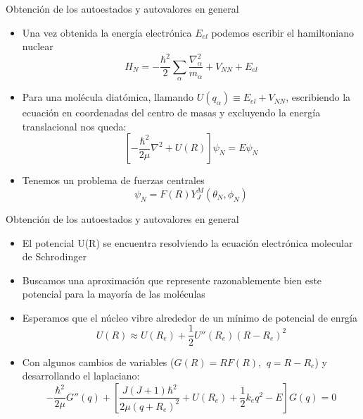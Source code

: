 \documentclass[a4paper]{beamer}
\begin{document}
\begin{frame}{Obtención de los autoestados y autovalores en general}
\begin{itemize}
\item Una vez obtenida la energía  electrónica $E_{el}$ podemos escribir el hamiltoniano nuclear
\begin{equation*}
\hat H_N=-\frac{\hbar^2}{2}\sum_\alpha \frac{\nabla^2_\alpha}{m_\alpha}+V_{NN}+E_{el}
\end{equation*}
\item Para una molécula diatómica, llamando $U(q_\alpha)\equiv E_{el}+V_{NN}$, escribiendo la ecuación en coordenadas del centro de masas y excluyendo la energía translacional nos queda:
\begin{equation*}
\left[-\frac{\hbar^2}{2\mu}\nabla^2+U(R)\right]\psi_N=E\psi_N
\end{equation*}
\item Tenemos un problema de fuerzas centrales
\begin{equation*}
\psi_N=F(R)Y^M_J(\theta_N,\phi_N)
\end{equation*}
\end{itemize}
\end{frame}

\begin{frame}{Obtención de los autoestados y autovalores en general}
\begin{itemize}
\item El potencial U(R) se encuentra resolviendo la ecuación electrónica molecular de Schrodinger
\item Buscamos una aproximación que represente razonablemente bien este potencial para la mayoría de las moléculas
\item Esperamos que el núcleo vibre alrededor de un mínimo de potencial de enrgía
\begin{equation*}
U(R) \approx U(R_e)+\frac{1}{2}U''(R_e)(R-R_e)^2
\end{equation*}
\item Con algunos cambios de variables ($G(R)=RF(R), \,\ q=R-R_e$) y desarrollando el laplaciano:
\begin{equation*}
-\frac{\hbar^2}{2\mu}G''(q)+\left[\frac{J(J+1)\hbar^2}{2\mu (q+R_e)^2}+U(R_e)+\frac{1}{2}k_eq^2-E\right]G(q)=0
\end{equation*}
\end{itemize}
\end{frame}
\end{document}
